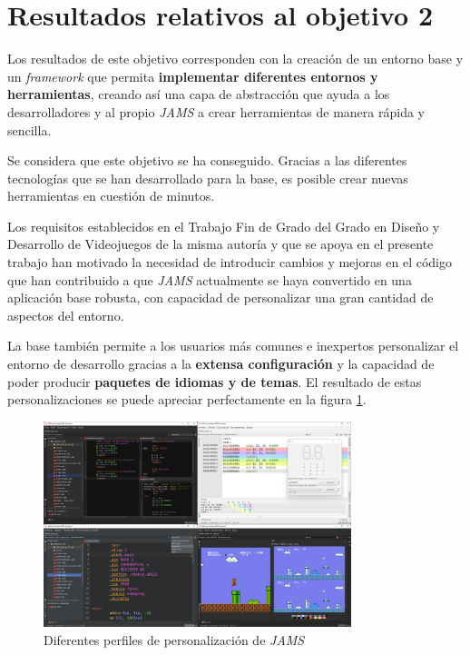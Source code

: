 \section{Resultados relativos al objetivo 2}\label{sec:resultados-relativos-al-objetivo-2}

Los resultados de este objetivo corresponden con la creación de
un entorno base y un \textit{framework} que permita \textbf{implementar
diferentes entornos y herramientas}, creando así una capa
de abstracción que ayuda a los desarrolladores y al propio
\textit{JAMS} a crear herramientas de manera rápida y sencilla.

Se considera que este objetivo se ha conseguido.
Gracias a las diferentes tecnologías que se han desarrollado
para la base, es posible crear nuevas herramientas en cuestión
de minutos.

Los requisitos establecidos en el Trabajo Fin de Grado del Grado en Diseño
y Desarrollo de Videojuegos de la misma autoría y que se apoya en el presente
trabajo han motivado la necesidad de introducir cambios y mejoras en el código
que han contribuido a que \textit{JAMS} actualmente se haya convertido en una
aplicación base robusta, con capacidad de personalizar
una gran cantidad de aspectos del entorno.

La base también permite a los usuarios más comunes e
inexpertos personalizar el entorno de desarrollo gracias a la
\textbf{extensa configuración} y la capacidad de poder producir
\textbf{paquetes de idiomas y de temas}.
El resultado de estas personalizaciones se puede apreciar
perfectamente en la figura \ref{fig:jams-collage}.

\begin{figure}[h]
    \centering
    \includegraphics[width=0.8\textwidth]{images/result/jams-collage}
    \caption{Diferentes perfiles de personalización de \textit{JAMS}}
    \label{fig:jams-collage}
\end{figure}

